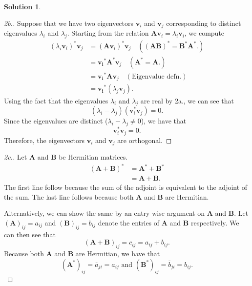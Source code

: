 \documentclass[12pt]{article}
\renewcommand{\vec}[1]{\mathbf{#1}}
\theoremstyle{definition}
\newtheorem{sol}{Solution}
\theoremstyle{remark}
\begin{document}
\begin{sol}
    \begin{proof}[2b.]
        Suppose that we have two eigenvectors $\vec{v}_i$ and $\vec{v}_j$ corresponding to distinct eigenvalues $\lambda_i$ and $\lambda_j$. Starting from the relation $\vec{Av}_i = \lambda_i\vec{v}_i$, we compute
        \begin{align}
            (\lambda_i \vec{v}_i)^*\vec{v}_j &= (\vec{A}\vec{v}_i)^*\vec{v}_j \quad ((\vec{AB})^* = \vec{B}^*\vec{A}^*.) \\
                                             &= \vec{v_i}^*\vec{A}^*\vec{v}_j  \quad ( \vec{A}^* = \vec{A}. )\\
                                             &= \vec{v_i}^*\vec{A}\vec{v}_j \quad (\text{Eigenvalue defn.})\\
                                             &= \vec{v_i}^*(\lambda_j\vec{v}_j).
        \end{align}
Using the fact that the eigenvalues $\lambda_i$ and $\lambda_j$ are real by 2a., we can see that
        \begin{equation}
            (\lambda_i - \lambda_j) (\vec{v}_i^*\vec{v}_j) = 0.
        \end{equation}
Since the eigenvalues are distinct ($\lambda_i - \lambda_j \neq 0$), we have that
\begin{equation}
            \vec{v}_i^*\vec{v}_j = 0.
\end{equation}
Therefore, the eigenvectors $\vec{v}_i$ and $\vec{v}_j$ are orthogonal.

    \end{proof}

    \begin{proof}[2c.] Let $\vec{A}$ and $\vec{B}$ be Hermitian matrices.
        \begin{align}
            (\vec{A} + \vec{B})^* &= \vec{A}^* + \vec{B}^* \\
                                  &= \vec{A} + \vec{B}.
        \end{align}
        The first line follow because the sum of the adjoint is equivalent to the adjoint of the sum. The last line follows because both $\vec{A}$ and $\vec{B}$ are Hermitian.

Alternatively, we can show the same by an entry-wise argument on $\vec{A}$ and $\vec{B}$. Let $(\vec{A})_{ij} = a_{ij}$ and $(\vec{B})_{ij} = b_{ij}$ denote the entries of $\vec{A}$ and $\vec{B}$ respectively. We can then see that
        \begin{equation}
            (\vec{A}+\vec{B})_{ij} = c_{ij} = a_{ij} + b_{ij}.
        \end{equation}
Because both $\vec{A}$ and $\vec{B}$ are Hermitian, we have that
\begin{equation}
    (\vec{A}^*)_{ij} = \bar{a}_{ji} = a_{ij} \text{ and } (\vec{B}^*)_{ij} = \bar{b}_{ji} = b_{ij}.
\end{equation}


\end{proof}
\end{sol}
\end{document}
